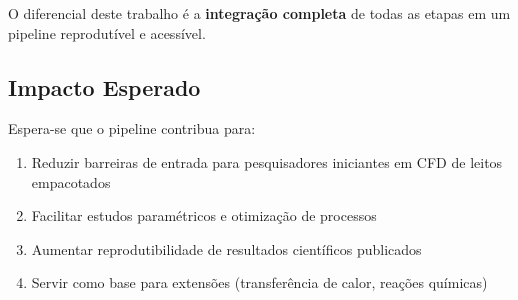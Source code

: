 O diferencial deste trabalho é a \textbf{integração completa} de todas as etapas em um pipeline reprodutível e acessível.

\subsection{Impacto Esperado}

Espera-se que o pipeline contribua para:

\begin{enumerate}
    \item Reduzir barreiras de entrada para pesquisadores iniciantes em CFD de leitos empacotados
    \item Facilitar estudos paramétricos e otimização de processos
    \item Aumentar reprodutibilidade de resultados científicos publicados
    \item Servir como base para extensões (transferência de calor, reações químicas)
\end{enumerate}

